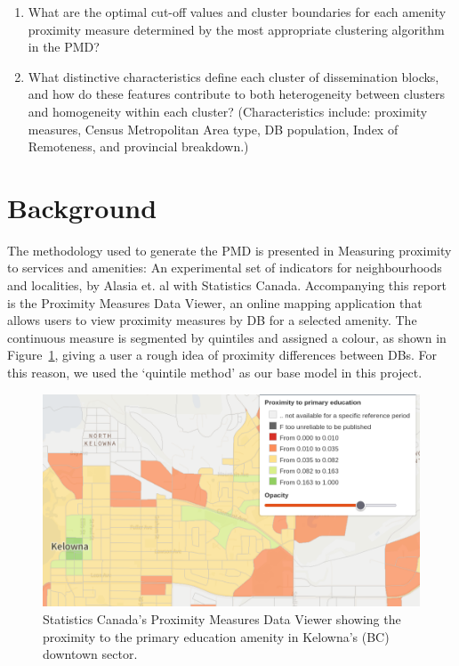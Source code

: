 \documentclass[11pt, a4paper]{article}
\begin{document}
\begin{enumerate}
\item What are the optimal cut-off values and cluster boundaries for each amenity proximity measure determined by the most appropriate clustering algorithm in the PMD?
\item What distinctive characteristics define each cluster of dissemination blocks, and how do these features contribute to both heterogeneity between clusters and homogeneity within each cluster? (Characteristics include: proximity measures, Census Metropolitan Area type, DB population, Index of Remoteness, and provincial breakdown.)
\end{enumerate}









\pagebreak
\section{Background}


The methodology used to generate the PMD is presented in Measuring proximity to services and amenities: An experimental set of indicators for neighbourhoods and localities, by Alasia et. al with Statistics Canada. Accompanying this report is the Proximity Measures Data Viewer, an online mapping application that allows users to view proximity measures by DB for a selected amenity. The continuous measure is segmented by quintiles and assigned a colour, as shown in Figure~\ref{pmdviewer}, giving a user a rough idea of proximity differences between DBs. For this reason, we used the `quintile method' as our base model in this project.


\begin{figure}[H]
\centering
\includegraphics[width=\textwidth]{./PMD_viewer/PMD_viewer.png}
\caption[Proximity Measures Data Viewer]{Statistics Canada’s Proximity Measures Data Viewer showing the proximity to the primary education amenity in Kelowna’s (BC) downtown sector.}\label{pmdviewer}
\end{figure}
\end{document}
